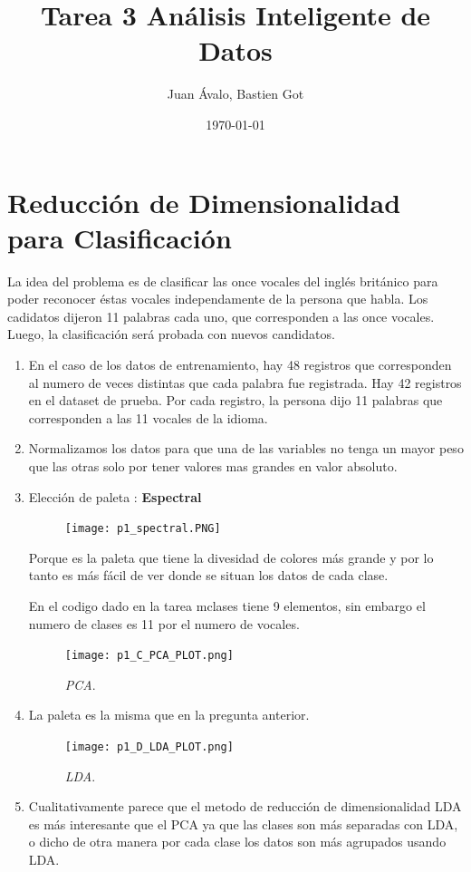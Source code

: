 \documentclass[11pt,letterpaper]{article}
\author{Juan Ávalo, Bastien Got}
\date{\today}
\title{Tarea 3 Análisis Inteligente de Datos}
\begin{document}
\maketitle
\tableofcontents

\section{Reducción de Dimensionalidad para Clasificación}
\label{sec:orgheadline1}
La idea del problema es de clasificar las once vocales del inglés británico
para poder reconocer éstas vocales independamente de la persona que habla. Los
cadidatos dijeron 11 palabras cada uno, que corresponden a las once vocales.
Luego, la clasificación será probada con nuevos candidatos.

\begin{enumerate}
\item En el caso de los datos de entrenamiento, hay 48 registros que corresponden
al numero de veces distintas que cada palabra fue registrada. Hay 42
registros en el dataset de prueba. Por cada registro, la persona dijo 11
palabras que corresponden a las 11 vocales de la idioma.
\item Normalizamos los datos para que una de las variables no tenga un mayor peso
que las otras solo por tener valores mas grandes en valor absoluto.
\item Elección de paleta : \textbf{Espectral}

\begin{figure}[H]
\centering
\texttt{[image: p1\_spectral.PNG]}
\end{figure} 
Porque es la paleta que tiene la divesidad de colores más grande y por lo
tanto es más fácil de ver donde se situan los datos de cada clase.

En el codigo dado en la tarea mclases tiene 9 elementos, sin embargo el
numero de clases es 11 por el numero de vocales.

\begin{figure}[H]
\centering
\texttt{[image: p1\_C\_PCA\_PLOT.png]}
\caption{\emph{PCA}.}
\end{figure}
\item La paleta es la misma que en la pregunta anterior.

\begin{figure}[H]
\centering
\texttt{[image: p1\_D\_LDA\_PLOT.png]}
\caption{\emph{LDA}.}
\end{figure}
\item Cualitativamente parece que el metodo de reducción de dimensionalidad LDA
es más interesante que el PCA ya que las clases son más separadas con LDA,
o dicho de otra manera por cada clase los datos son más agrupados usando LDA.


\end{enumerate}
\end{document}
